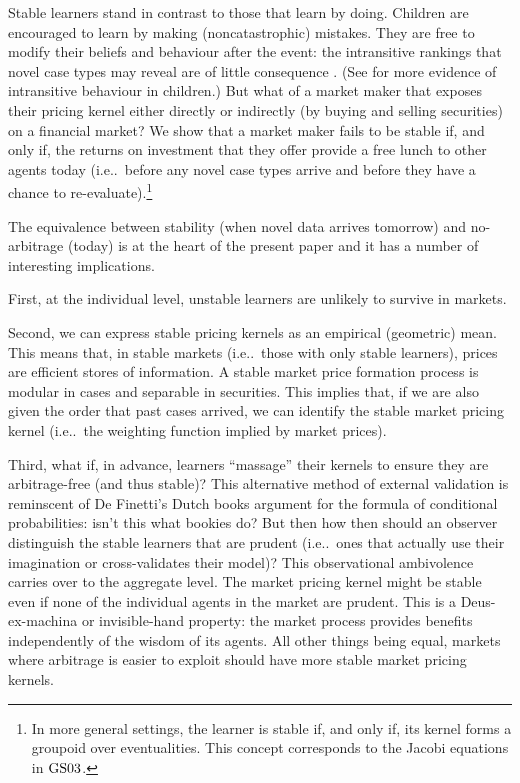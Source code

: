 \documentclass[ecta,nameyear,draft]{econsocart}
\makeatletter
\newcommand\ie{i\@.e\@ifnextchar.{}{.\@}}
\newcommand{\gsii}{$\textup{GS03}$}
\theoremstyle{plain}
\theoremstyle{remark}
\makeatother
\begin{document}
Stable learners stand in contrast to those that learn by doing. Children are
encouraged to learn by making (noncatastrophic) mistakes. They are free to
modify their beliefs and behaviour after the event: the intransitive rankings
that novel case types may reveal are of little consequence
\citep{bradbury1990effects}. (See
\citep{weinstein1968transitivity,bradbury1974transitivity} for more evidence of
intransitive behaviour in children.) But what of a market maker that exposes
their pricing kernel either directly or indirectly (by buying and selling
securities) on a financial market? We show that a market maker fails to be
stable if, and only if, the returns on investment that they offer provide a
free lunch to other agents today (\ie\ before any novel case types arrive and
before they have a chance to re-evaluate).\footnote{In
  more general settings, the learner is stable if, and only if, its kernel
  forms a groupoid over eventualities. This concept corresponds to the Jacobi
equations in \gsii.}



The equivalence between stability
(when novel data arrives tomorrow) and no-arbitrage (today) is at the heart of
the present paper and it has a number of interesting implications.

First, at the individual level, unstable learners are unlikely to survive in
markets.

Second, we can express stable pricing kernels as an empirical (geometric) mean.
This means that, in stable markets (\ie\ those with only stable learners),
prices are efficient stores of information. A stable market price formation
process is modular in cases and separable in securities. This implies that, if
we are also given the order that past cases arrived, we can identify the stable
market pricing kernel (\ie\ the weighting function implied by market prices).
 
Third, what if, in advance, learners ``massage'' their kernels to ensure they
are arbitrage-free (and thus stable)? This alternative method of external
validation is reminscent of De Finetti's Dutch books argument for the formula
of conditional probabilities: isn't this what bookies do?  But then how then
should an observer distinguish the stable learners that are prudent (\ie\ ones
that actually use their imagination or cross-validates their model)?  This
observational ambivolence carries over to the aggregate level.  The market
pricing kernel might be stable even if none of the individual agents in the
market are prudent.  This is a Deus-ex-machina or invisible-hand property: the
market process provides benefits independently of the wisdom of its agents. 
All other things being equal, markets where arbitrage is easier to exploit
should have more stable market pricing kernels.
 
\end{document}
